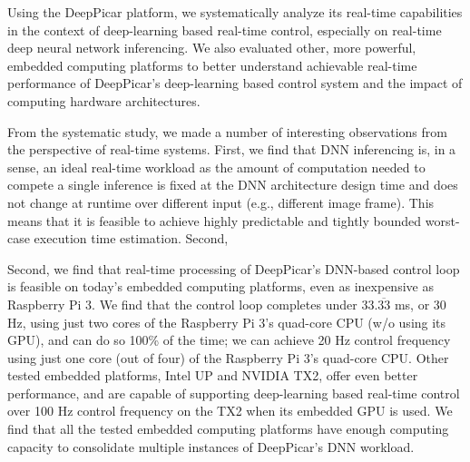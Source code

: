 Using the DeepPicar platform, we systematically analyze its real-time
capabilities in the context of deep-learning based real-time
control, especially on real-time deep neural network inferencing.
We also evaluated other, more powerful, embedded computing
platforms to better understand achievable real-time performance of
DeepPicar's deep-learning based control system and the impact of
computing hardware architectures.

%
%
%
%
%
%
From the systematic study, we made a number of interesting
observations from the perspective of real-time systems.
First, we find that DNN inferencing is, in a sense, an ideal real-time
workload as the amount of computation needed to compete a single
inference is fixed at the DNN architecture design time and does not
change at runtime over different input (e.g., different image frame).
This means that it is feasible to achieve highly predictable and
tightly bounded worst-case execution time estimation.
Second,

Second, we find that real-time processing of DeepPicar's DNN-based
control loop is feasible on today's embedded computing platforms, even 
as inexpensive as Raspberry Pi 3. We find that the control loop completes 
under 33.$\overline{\mbox{33}}$ ms, or 30 Hz, using just two cores of
the Raspberry Pi 3's quad-core CPU (w/o using its GPU), and can
do so 100\% of the time; we can achieve 20 Hz control frequency using
just one core (out of four) of the Raspberry Pi 3's quad-core CPU.
Other tested embedded platforms, Intel UP and NVIDIA TX2, offer even
better performance, and are capable of supporting deep-learning based 
real-time control over 100 Hz control frequency on the TX2 when its
embedded GPU is used.
We find that all the tested embedded computing platforms have 
enough computing capacity to consolidate multiple instances of
DeepPicar's DNN workload.

